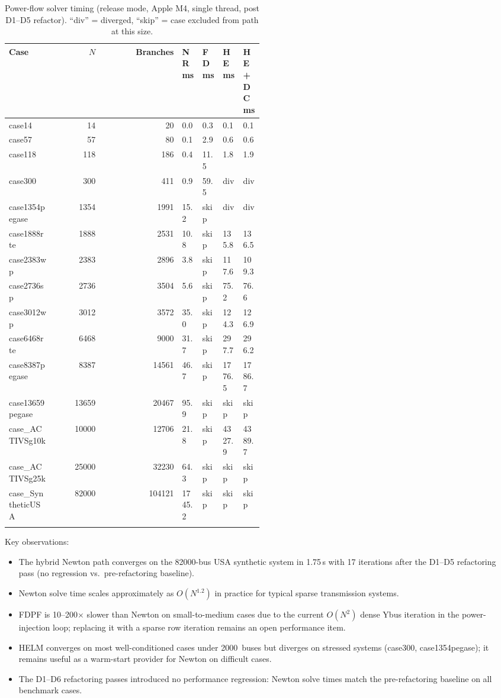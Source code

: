 \begin{longtable}{L{0.18\linewidth}rr
  L{0.08\linewidth}L{0.08\linewidth}
  L{0.08\linewidth}L{0.08\linewidth}}
\toprule
Case & $N$ & Branches & NR ms & FD ms & HE ms & HE+DC ms \\
\midrule
\endhead
case14 & 14 & 20 & 0.0 & 0.3 & 0.1 & 0.1 \\
case57 & 57 & 80 & 0.1 & 2.9 & 0.6 & 0.6 \\
case118 & 118 & 186 & 0.4 & 11.5 & 1.8 & 1.9 \\
case300 & 300 & 411 & 0.9 & 59.5 & div & div \\
case1354pegase & 1354 & 1991 & 15.2 & skip & div & div \\
case1888rte & 1888 & 2531 & 10.8 & skip & 135.8 & 136.5 \\
case2383wp & 2383 & 2896 & 3.8 & skip & 117.6 & 109.3 \\
case2736sp & 2736 & 3504 & 5.6 & skip & 75.2 & 76.6 \\
case3012wp & 3012 & 3572 & 35.0 & skip & 124.3 & 126.9 \\
case6468rte & 6468 & 9000 & 31.7 & skip & 297.7 & 296.2 \\
case8387pegase & 8387 & 14561 & 46.7 & skip & 1776.5 & 1786.7 \\
case13659pegase & 13659 & 20467 & 95.9 & skip & skip & skip \\
case\_ACTIVSg10k & 10000 & 12706 & 21.8 & skip & 4327.9 & 4389.7 \\
case\_ACTIVSg25k & 25000 & 32230 & 64.3 & skip & skip & skip \\
case\_SyntheticUSA & 82000 & 104121 & 1745.2 & skip & skip & skip \\
\bottomrule
\caption{Power-flow solver timing (release mode, Apple M4, single thread, post D1--D5 refactor).
``div'' = diverged, ``skip'' = case excluded from path at this size.}
\label{tab:pf-perf}
\end{longtable}

Key observations:
\begin{itemize}
  \item The hybrid Newton path converges on the 82000-bus USA synthetic system
    in 1.75\,s with 17 iterations after the D1--D5 refactoring pass
    (no regression vs.\ pre-refactoring baseline).
  \item Newton solve time scales approximately as $O(N^{1.2})$ in practice for
    typical sparse transmission systems.
  \item FDPF is 10--200$\times$ slower than Newton on small-to-medium cases due
    to the current $O(N^2)$ dense Ybus iteration in the power-injection loop;
    replacing it with a sparse row iteration remains an open performance item.
  \item HELM converges on most well-conditioned cases under 2000~buses but
    diverges on stressed systems (case300, case1354pegase); it
    remains useful as a warm-start provider for Newton on difficult cases.
  \item The D1--D6 refactoring passes introduced no performance regression:
    Newton solve times match the pre-refactoring baseline on all benchmark cases.
\end{itemize}
